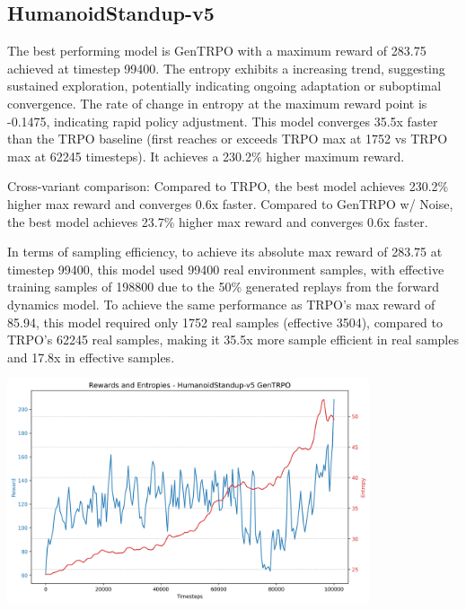 \documentclass{svproc}
\begin{document}
\subsection{HumanoidStandup-v5}
The best performing model is GenTRPO with a maximum reward of 283.75 achieved at timestep 99400. The entropy exhibits a increasing trend, suggesting sustained exploration, potentially indicating ongoing adaptation or suboptimal convergence. The rate of change in entropy at the maximum reward point is -0.1475, indicating rapid policy adjustment. This model converges 35.5x faster than the TRPO baseline (first reaches or exceeds TRPO max at 1752 vs TRPO max at 62245 timesteps). It achieves a 230.2\% higher maximum reward. 

Cross-variant comparison: Compared to TRPO, the best model achieves 230.2\% higher max reward and converges 0.6x faster. Compared to GenTRPO w/ Noise, the best model achieves 23.7\% higher max reward and converges 0.6x faster. 

In terms of sampling efficiency, to achieve its absolute max reward of 283.75 at timestep 99400, this model used 99400 real environment samples, with effective training samples of 198800 due to the 50\% generated replays from the forward dynamics model. To achieve the same performance as TRPO's max reward of 85.94, this model required only 1752 real samples (effective 3504), compared to TRPO's 62245 real samples, making it 35.5x more sample efficient in real samples and 17.8x in effective samples.

\begin{center}
\includegraphics[width=0.8\textwidth]{graph_HumanoidStandup-v5_gentrpo_rewards_entropies.png}
\end{center}
\end{document}
